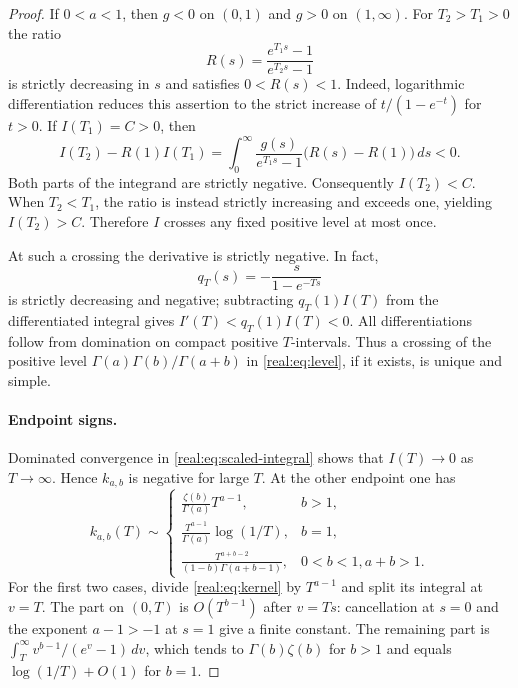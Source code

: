 \begin{proof}
If $0<a<1$, then $g<0$ on $(0,1)$ and $g>0$ on $(1,\infty)$.
For $T_2>T_1>0$ the ratio
\[
 R(s)=\frac{e^{T_1s}-1}{e^{T_2s}-1}
\]
is strictly decreasing in $s$ and satisfies $0<R(s)<1$.
Indeed, logarithmic differentiation reduces this assertion to the
strict increase of $t/(1-e^{-t})$ for $t>0$. If $I(T_1)=C>0$,
then
\[
 I(T_2)-R(1)I(T_1)
 =\int_0^\infty\frac{g(s)}{e^{T_1s}-1}
       \bigl(R(s)-R(1)\bigr)\,ds<0.
\]
Both parts of the integrand are strictly negative. Consequently
$I(T_2)<C$. When $T_2<T_1$, the ratio is instead strictly increasing
and exceeds one, yielding $I(T_2)>C$. Therefore $I$ crosses any
fixed positive level at most once.

At such a crossing the derivative is strictly negative. In fact,
\[
 q_T(s)=-\frac{s}{1-e^{-Ts}}
\]
is strictly decreasing and negative; subtracting $q_T(1)I(T)$ from
the differentiated integral gives
$I'(T)<q_T(1)I(T)<0$. All differentiations follow from domination on
compact positive $T$-intervals. Thus a crossing of the positive level
$\Gamma(a)\Gamma(b)/\Gamma(a+b)$ in \eqref{real:eq:level}, if it
exists, is unique and simple.

\paragraph{Endpoint signs.}
Dominated convergence in \eqref{real:eq:scaled-integral} shows that
$I(T)\to0$ as $T\to\infty$. Hence $k_{a,b}$ is negative for large
$T$. At the other endpoint one has
\begin{equation}\label{real:eq:endpoints}
 k_{a,b}(T)\sim
 \begin{cases}
 \displaystyle\frac{\zeta(b)}{\Gamma(a)}T^{a-1},&b>1,\\[5pt]
 \displaystyle\frac{T^{a-1}}{\Gamma(a)}\log(1/T),&b=1,\\[5pt]
 \displaystyle\frac{T^{a+b-2}}{(1-b)\Gamma(a+b-1)},
       &0<b<1, a+b>1.
 \end{cases}
\end{equation}
For the first two cases, divide \eqref{real:eq:kernel} by $T^{a-1}$
and split its integral at $v=T$. The part on $(0,T)$ is
$O(T^{b-1})$ after $v=Ts$: cancellation at $s=0$ and the exponent
$a-1>-1$ at $s=1$ give a finite constant. The remaining part is
$\int_T^\infty v^{b-1}/(e^v-1)\,dv$, which tends to
$\Gamma(b)\zeta(b)$ for $b>1$ and equals
$\log(1/T)+O(1)$ for $b=1$.


\end{proof}
